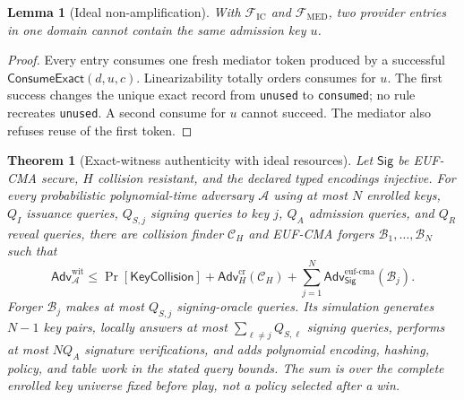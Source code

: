 \documentclass[10pt]{article}
\newtheorem{theorem}{Theorem}
\newtheorem{lemma}{Lemma}
\newcommand{\code}[1]{\texttt{#1}}
\newcommand{\Adv}{\mathsf{Adv}}
\begin{document}
\begin{lemma}[Ideal non-amplification]
With $\mathcal F_{\mathrm{IC}}$ and $\mathcal F_{\mathrm{MED}}$, two provider
entries in one domain cannot contain the same admission key $u$.
\end{lemma}

\begin{proof}
Every entry consumes one fresh mediator token produced by a successful
$\mathsf{ConsumeExact}(d,u,c)$. Linearizability totally orders consumes for
$u$. The first success changes the unique exact record from \code{unused} to
\code{consumed}; no rule recreates \code{unused}. A second consume for $u$
cannot succeed. The mediator also refuses reuse of the first token.
\end{proof}

\begin{theorem}[Exact-witness authenticity with ideal resources]
Let $\mathsf{Sig}$ be EUF-CMA secure, $H$ collision resistant, and the declared
typed encodings injective. For every probabilistic polynomial-time adversary
$\mathcal A$ using at most $N$ enrolled keys, $Q_I$ issuance queries,
$Q_{S,j}$ signing queries to key $j$, $Q_A$ admission queries, and $Q_R$ reveal
queries, there are collision finder $\mathcal C_H$ and EUF-CMA forgers
$\mathcal B_1,\ldots,\mathcal B_N$ such that
\[
 \Adv^{\mathrm{wit}}_{\mathcal A}
 \leq
 \Pr[\mathsf{KeyCollision}]
 +\Adv^{\mathrm{cr}}_H(\mathcal C_H)
 +\sum_{j=1}^{N}
   \Adv^{\mathrm{euf\mbox{-}cma}}_{\mathsf{Sig}}(\mathcal B_j).
\]
Forger $\mathcal B_j$ makes at most $Q_{S,j}$ signing-oracle queries. Its
simulation generates $N-1$ key pairs, locally answers at most
$\sum_{\ell\neq j}Q_{S,\ell}$ signing queries, performs at most $NQ_A$
signature verifications, and adds polynomial encoding, hashing, policy, and
table work in the stated query bounds. The sum is over the complete enrolled
key universe fixed before play, not a policy selected after a win.
\end{theorem}
\end{document}
